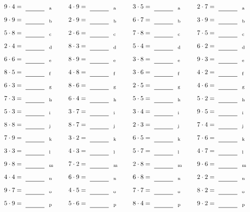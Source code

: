 \documentclass
[
  draft    = true,
  fontsize = 11pt,
  parskip  = half-
]
{scrartcl}
\begin{document}
\par\vfill\par
\begin{align*}
    \pline{9\cdot4}&=\rline{a}
  & \pline{4\cdot9}&=\rline{a}
  & \pline{3\cdot5}&=\rline{a}
  & \pline{2\cdot7}&=\rline{a} \\[1ex]
    \pline{9\cdot9}&=\rline{b}
  & \pline{2\cdot9}&=\rline{b}
  & \pline{6\cdot7}&=\rline{b}
  & \pline{3\cdot9}&=\rline{b} \\[1ex]
    \pline{5\cdot8}&=\rline{c}
  & \pline{2\cdot6}&=\rline{c}
  & \pline{7\cdot8}&=\rline{c}
  & \pline{7\cdot5}&=\rline{c} \\[1ex]
    \pline{2\cdot4}&=\rline{d}
  & \pline{8\cdot3}&=\rline{d}
  & \pline{5\cdot4}&=\rline{d}
  & \pline{6\cdot2}&=\rline{d} \\[1ex]
    \pline{6\cdot6}&=\rline{e}
  & \pline{8\cdot9}&=\rline{e}
  & \pline{3\cdot8}&=\rline{e}
  & \pline{9\cdot3}&=\rline{e} \\[1ex]
    \pline{8\cdot5}&=\rline{f}
  & \pline{4\cdot8}&=\rline{f}
  & \pline{3\cdot6}&=\rline{f}
  & \pline{4\cdot2}&=\rline{f} \\[1ex]
    \pline{6\cdot3}&=\rline{g}
  & \pline{8\cdot6}&=\rline{g}
  & \pline{2\cdot5}&=\rline{g}
  & \pline{4\cdot6}&=\rline{g} \\[1ex]
    \pline{7\cdot3}&=\rline{h}
  & \pline{6\cdot4}&=\rline{h}
  & \pline{5\cdot5}&=\rline{h}
  & \pline{5\cdot2}&=\rline{h} \\[1ex]
    \pline{5\cdot3}&=\rline{i}
  & \pline{3\cdot7}&=\rline{i}
  & \pline{3\cdot4}&=\rline{i}
  & \pline{9\cdot5}&=\rline{i} \\[1ex]
    \pline{8\cdot8}&=\rline{j}
  & \pline{8\cdot7}&=\rline{j}
  & \pline{2\cdot3}&=\rline{j}
  & \pline{7\cdot4}&=\rline{j} \\[1ex]
    \pline{7\cdot9}&=\rline{k}
  & \pline{3\cdot2}&=\rline{k}
  & \pline{6\cdot5}&=\rline{k}
  & \pline{7\cdot6}&=\rline{k} \\[1ex]
    \pline{3\cdot3}&=\rline{l}
  & \pline{4\cdot3}&=\rline{l}
  & \pline{5\cdot7}&=\rline{l}
  & \pline{4\cdot7}&=\rline{l} \\[1ex]
    \pline{9\cdot8}&=\rline{m}
  & \pline{7\cdot2}&=\rline{m}
  & \pline{2\cdot8}&=\rline{m}
  & \pline{9\cdot6}&=\rline{m} \\[1ex]
    \pline{4\cdot4}&=\rline{n}
  & \pline{6\cdot9}&=\rline{n}
  & \pline{6\cdot8}&=\rline{n}
  & \pline{2\cdot2}&=\rline{n} \\[1ex]
    \pline{9\cdot7}&=\rline{o}
  & \pline{4\cdot5}&=\rline{o}
  & \pline{7\cdot7}&=\rline{o}
  & \pline{8\cdot2}&=\rline{o} \\[1ex]
    \pline{5\cdot9}&=\rline{p}
  & \pline{5\cdot6}&=\rline{p}
  & \pline{8\cdot4}&=\rline{p}
  & \pline{9\cdot2}&=\rline{p}
\end{align*}
\end{document}
